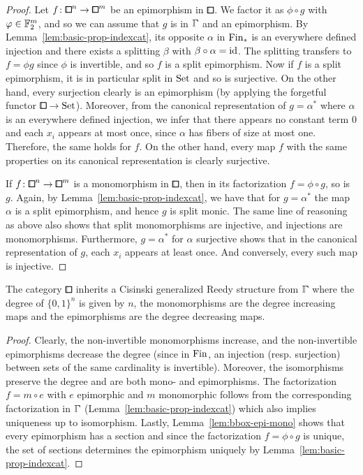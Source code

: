 \begin{proof}
Let $f\colon{\bbox}^n\to{\bbox}^m$ be an epimorphism in ${\bbox}$.
We factor it as $\phi\circ g$ with $\varphi\in\mathbb{F}_2^m$, and so we can assume that $g$ is in $\bbGamma$
and an epimorphism.
By Lemma~\ref{lem:basic-prop-indexcat}, its opposite $\alpha$ in $\mathrm{Fin}_\ast$ is an everywhere defined injection and there exists a splitting $\beta$ with $\beta\circ\alpha = \operatorname{id}$.
The splitting transfers to $f=\phi g$ since $\phi$ is invertible, and so $f$ is a split epimorphism.
Now if $f$ is a split epimorphism, it is in particular split in $\mathrm{Set}$ and so is surjective.
On the other hand, every surjection clearly is an epimorphism (by applying the forgetful functor $\bbox\to\set$).
Moreover, from the canonical representation of $g = \alpha^\ast$ where $\alpha$ is an everywhere defined injection,
we infer that there appears no constant term $0$ and each $x_i$ appears at most once, since $\alpha$ has fibers of size at most one.
Therefore, the same holds for $f$.
On the other hand, every map $f$ with the same properties on its canonical representation is clearly surjective.

If $f\colon{\bbox}^n\to{\bbox}^m$ is a monomorphism in $\bbox$,
then in its factorization $f=\phi\circ g$, so is $g$.
Again, by Lemma~\ref{lem:basic-prop-indexcat}, we have that for $g=\alpha^\ast$ the map $\alpha$ is a split epimorphism, and hence $g$ is split monic.
The same line of reasoning as above also shows that split monomorphisms are injective,
and injections are monomorphisms.
Furthermore, $g=\alpha^\ast$ for $\alpha$ surjective shows that in the canonical representation of $g$,
each $x_i$ appears at least once.
And conversely, every such map is injective.
\end{proof}

\begin{lemma}\label{lem:bbox-reedy-cat}
The category $\bbox$ inherits a Cisinski generalized Reedy structure from $\bbGamma$
where the degree of $\{0,1\}^n$ is given by $n$,
the monomorphisms are the degree increasing maps and the epimorphisms are the degree decreasing maps.
\end{lemma}

\begin{proof}
Clearly, the non-invertible monomorphisms increase, and the non-invertible epimorphisms decrease the degree (since in $\mathrm{Fin}$, an injection (resp. surjection) between sets of the same cardinality is invertible).
Moreover, the isomorphisms preserve the degree and are both mono- and epimorphisms.
The factorization $f = m\circ e$ with $e$ epimorphic and $m$ monomorphic
follows from the corresponding factorization in $\bbGamma$ (Lemma~\ref{lem:basic-prop-indexcat})
which also implies uniqueness up to isomorphism.
Lastly, Lemma~\ref{lem:bbox-epi-mono} shows that every epimorphism has a section
and since the factorization $f = \phi\circ g$ is unique,
the set of sections determines the epimorphism uniquely by Lemma~\ref{lem:basic-prop-indexcat}.
\end{proof}

